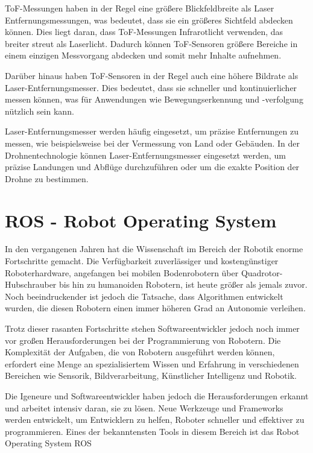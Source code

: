ToF-Messungen haben in der Regel eine größere Blickfeldbreite als Laser Entfernungsmessungen, was bedeutet, dass sie ein größeres Sichtfeld abdecken können. Dies liegt daran, dass ToF-Messungen Infrarotlicht verwenden, das breiter streut als Laserlicht. Dadurch können ToF-Sensoren größere Bereiche in einem einzigen Messvorgang abdecken und somit mehr Inhalte aufnehmen.

Darüber hinaus haben ToF-Sensoren in der Regel auch eine höhere Bildrate als Laser-Entfernungsmesser. Dies bedeutet, dass sie schneller und kontinuierlicher messen können, was für Anwendungen wie Bewegungserkennung und -verfolgung nützlich sein kann.

Laser-Entfernungsmesser werden häufig eingesetzt, um präzise Entfernungen zu messen, wie beispielsweise bei der Vermessung von Land oder Gebäuden. In der Drohnentechnologie können Laser-Entfernungsmesser eingesetzt werden, um präzise Landungen und Abflüge durchzuführen oder um die exakte Position der Drohne zu bestimmen.




\section{ROS - Robot Operating System} \label{ros:section}
In den vergangenen Jahren hat die Wissenschaft im Bereich der Robotik enorme Fortschritte gemacht. Die Verfügbarkeit zuverlässiger und kostengünstiger Roboterhardware, angefangen bei mobilen Bodenrobotern über Quadrotor-Hubschrauber bis hin zu humanoiden Robotern, ist heute größer als jemals zuvor. Noch beeindruckender ist jedoch die Tatsache, dass Algorithmen entwickelt wurden, die diesen Robotern einen immer höheren Grad an Autonomie verleihen.

Trotz dieser rasanten Fortschritte stehen Softwareentwickler jedoch noch immer vor großen Herausforderungen bei der Programmierung von Robotern. Die Komplexität der Aufgaben, die von Robotern ausgeführt werden können, erfordert eine Menge an spezialisiertem Wissen und Erfahrung in verschiedenen Bereichen wie Sensorik, Bildverarbeitung, Künstlicher Intelligenz und Robotik.

Die Igeneure und Softwareentwickler haben jedoch die Herausforderungen erkannt und arbeitet intensiv daran, sie zu lösen. Neue Werkzeuge und Frameworks werden entwickelt, um Entwicklern zu helfen, Roboter schneller und effektiver zu programmieren. Eines der bekanntensten Tools in diesem Bereich ist das Robot Operating System \ac{ROS}

